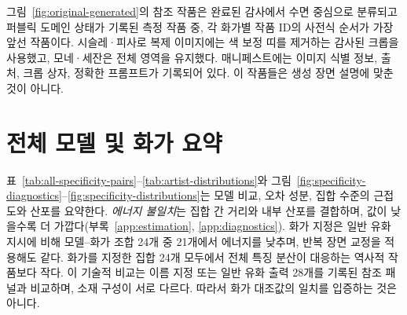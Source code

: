 \documentclass[11pt,a4paper]{article}
\begin{document}
그림~\ref{fig:original-generated}의 참조 작품은 완료된 감사에서 수면 중심으로 분류되고 퍼블릭 도메인 상태가 기록된 측정 작품 중, 각 화가별 작품 ID의 사전식 순서가 가장 앞선 작품이다. 시슬레·피사로 복제 이미지에는 색 보정 띠를 제거하는 감사된 크롭을 사용했고, 모네·세잔은 전체 영역을 유지했다. 매니페스트에는 이미지 식별 정보, 출처, 크롭 상자, 정확한 프롬프트가 기록되어 있다. 이 작품들은 생성 장면 설명에 맞춘 것이 아니다.
\FloatBarrier

\section{전체 모델 및 화가 요약}\label{app:results}
표~\ref{tab:all-specificity-pairs}--\ref{tab:artist-distributions}와 그림~\ref{fig:specificity-diagnostics}--\ref{fig:specificity-distributions}는 모델 비교, 오차 성분, 집합 수준의 근접도와 산포를 요약한다. \emph{에너지 불일치}는 집합 간 거리와 내부 산포를 결합하며, 값이 낮을수록 더 가깝다(부록~\ref{app:estimation}, \ref{app:diagnostics}). 화가 지정은 일반 유화 지시에 비해 모델--화가 조합 24개 중 21개에서 에너지를 낮추며, 반복 장면 교정을 적용해도 같다. 화가를 지정한 집합 24개 모두에서 전체 특징 분산이 대응하는 역사적 작품보다 작다. 이 기술적 비교는 이름 지정 또는 일반 유화 출력 28개를 기록된 참조 패널과 비교하며, 소재 구성이 서로 다르다. 따라서 화가 대조값의 일치를 입증하는 것은 아니다.
\end{document}
